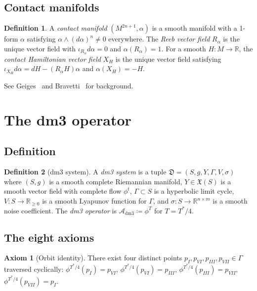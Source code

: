 \documentclass[12pt, oneside]{book}
\theoremstyle{plain}
\theoremstyle{definition}
\newtheorem{definition}{Definition}[section]
\newtheorem{axiom}{Axiom}
\theoremstyle{remark}
\newcommand{\R}{\mathbb{R}}
\newcommand{\dm}{\mathfrak{D}}
\newcommand{\Orb}{\Gamma}
\begin{document}
\subsection{Contact manifolds}

\begin{definition}\label{def:contact}
A \emph{contact manifold} $(M^{2n+1},\alpha)$ is a smooth manifold
with a 1-form $\alpha$ satisfying $\alpha\wedge(d\alpha)^n\ne 0$
everywhere. The \emph{Reeb vector field} $R_\alpha$ is the unique
vector field with $\iota_{R_\alpha}d\alpha=0$ and $\alpha(R_\alpha)=1$.
For a smooth $H\colon M\to\R$, the \emph{contact Hamiltonian vector
field} $X_H$ is the unique vector field satisfying
$\iota_{X_H}d\alpha=dH-(R_\alpha H)\alpha$ and $\alpha(X_H)=-H$.
\end{definition}

See Geiges~\cite{Geiges} and Bravetti~\cite{Bravetti2017} for background.

\section{The dm3 operator}\label{sec:dm3}

\subsection{Definition}

\begin{definition}[dm3 system]\label{def:dm3}
A \emph{dm3 system} is a tuple $\dm=(S,g,Y,\Orb,V,\sigma)$ where
$(S,g)$ is a smooth complete Riemannian manifold, $Y\in\mathfrak{X}(S)$
is a smooth vector field with complete flow $\phi^t$, $\Orb\subset S$
is a hyperbolic limit cycle, $V\colon S\to\R_{\ge 0}$ is a smooth
Lyapunov function for $\Orb$, and $\sigma\colon S\to\R^{n\times m}$
is a smooth noise coefficient. The \emph{dm3 operator} is
$\mathcal{A}_{\mathrm{dm3}}\coloneqq\phi^T$ for $T=T^*/4$.
\end{definition}

\subsection{The eight axioms}\label{subsec:axioms}

\begin{axiom}[Orbit identity]\label{ax:orbit}
There exist four distinct points $p_I,p_{VI},p_{III},p_{VII}\in\Orb$
traversed cyclically:
$\phi^{T^*/4}(p_I)=p_{VI}$, $\phi^{T^*/4}(p_{VI})=p_{III}$,
$\phi^{T^*/4}(p_{III})=p_{VII}$, $\phi^{T^*/4}(p_{VII})=p_I$.
\end{axiom}
\end{document}
